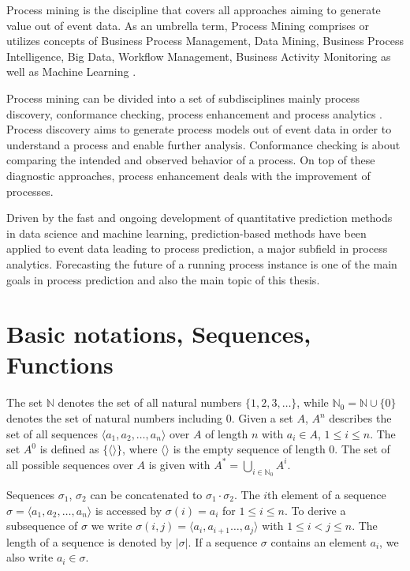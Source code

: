 Process mining is the discipline that covers all approaches aiming to generate value out of event data.
As an umbrella term, Process Mining comprises or utilizes concepts of Business Process Management, Data Mining, Business Process Intelligence, Big Data, Workflow Management, Business Activity Monitoring \cite{DBLP:books/sp/Aalst16} as well as Machine Learning \cite{DBLP:conf/bpm/VeitGMHT17}.

Process mining can be divided into a set of subdisciplines mainly process discovery, conformance checking, process enhancement and process analytics \cite{DBLP:conf/caise/EckLLA15}.
Process discovery aims to generate process models out of event data in order to understand a process and enable further analysis.
Conformance checking is about comparing the intended and observed behavior of a process. 
On top of these diagnostic approaches, process enhancement deals with the improvement of processes.

Driven by the fast and ongoing development of quantitative prediction methods in data science and machine learning, prediction-based methods have been applied to event data leading to process prediction, a major subfield in process analytics.
Forecasting the future of a running process instance is one of the main goals in process prediction and also the main topic of this thesis.


\section{Basic notations, Sequences, Functions}

The set $\mathbb{N}$ denotes the set of all natural numbers $\{1, 2, 3, \dots\}$, while $\mathbb{N}_0 = \mathbb{N} \cup \{0\}$ denotes the set of natural numbers including 0.
Given a set $A$, $A^n$ describes the set of all sequences $\langle a_1, a_2, \dots, a_n\rangle$ over $A$ of length $n$ with $a_i \in A$, $1 \leq i \leq n$.
The set $A^0$ is defined as $\{\langle \rangle\}$, where $\langle \rangle$ is the empty sequence of length $0$.
The set of all possible sequences over $A$ is given with $A^* = \bigcup\limits_{i\in \mathbb{N}_0} A^i$.

Sequences $\sigma_1$, $\sigma_2$ can be concatenated to $\sigma_1 \cdot \sigma_2$.
The $i$th element of a sequence $\sigma = \langle a_1, a_2, \dots, a_n\rangle$ is accessed by $\sigma(i)= a_i$ for $1 \leq i \leq n$.
To derive a subsequence of $\sigma$ we write $\sigma(i,j)=\langle a_i, a_{i+1} \dots, a_j\rangle$ with $1 \leq i < j \leq n$.
The length of a sequence is denoted by $|\sigma|$. If a sequence $\sigma$ contains an element $a_i$, we also write $a_i \in \sigma$.



